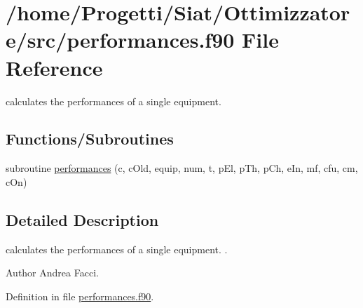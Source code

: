 \hypertarget{performances_8f90}{\section{/home/\-Progetti/\-Siat/\-Ottimizzatore/src/performances.f90 File Reference}
\label{performances_8f90}
}


calculates the performances of a single equipment.  


\subsection*{Functions/\-Subroutines}
\begin{DoxyCompactItemize}
\item 
subroutine \hyperlink{performances_8f90_a84c9587b317772dca6d4c6ac4827aa3d}{performances} (c, c\-Old, equip, num, t, p\-El, p\-Th, p\-Ch, e\-In, mf, cfu, cm, c\-On)
\end{DoxyCompactItemize}


\subsection{Detailed Description}
calculates the performances of a single equipment. . \begin{DoxyAuthor}{Author}
Andrea Facci. 
\end{DoxyAuthor}


Definition in file \hyperlink{performances_8f90_source}{performances.\-f90}.



